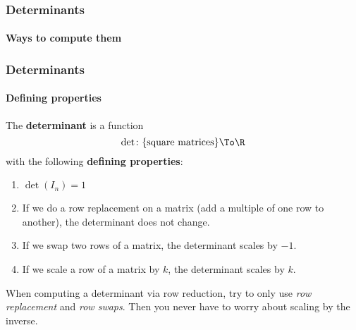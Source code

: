 
\begin{frame}
\frametitle{Determinants}
\framesubtitle{Ways to compute them}

\vskip -3mm

\end{frame}



\begin{frame}
\frametitle{Determinants}
\framesubtitle{Defining properties}

\vskip-3mm
\begin{defn}
  The \textbf{determinant} is a function
  \[ \det\colon \{\text{square matrices}\} \To \R \]
  with the following \textbf{defining properties}:
  \begin{enumerate}
  \item $\det(I_n) = 1$
  \item If we do a row replacement on a matrix (add a multiple of one row to
    another), the determinant does not change.
  \item If we swap two rows of a matrix, the determinant scales by $-1$.
  \item If we scale a row of a matrix by $k$, the determinant scales by $k$.
  \end{enumerate}
\end{defn}

\pause\bigskip
When computing a determinant via row reduction, try to only use 
\emph{row replacement} and \emph{row swaps}.
\pause
Then you never have to worry about scaling by the inverse.

\end{frame}


